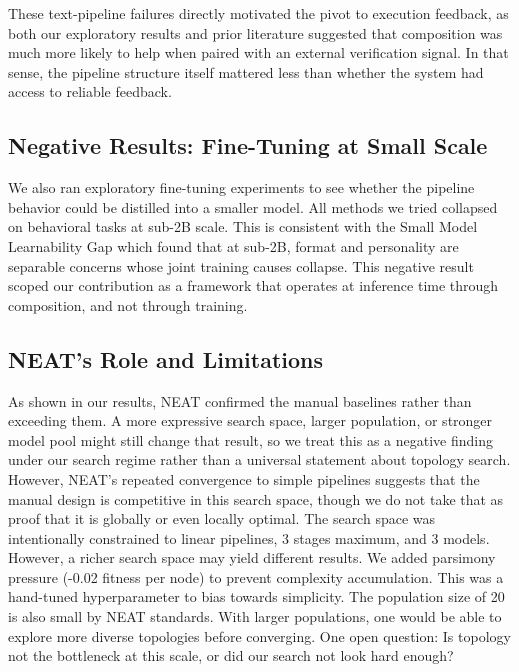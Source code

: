 \documentclass{article}
\begin{document}
These text-pipeline failures directly motivated the pivot to execution feedback, as both our exploratory results and prior literature suggested that composition was much more likely to help when paired with an external verification signal. In that sense, the pipeline structure itself mattered less than whether the system had access to reliable feedback.

\subsection{Negative Results: Fine-Tuning at Small Scale}
We also ran exploratory fine-tuning experiments to see whether the pipeline behavior could be distilled into a smaller model. All methods we tried collapsed on behavioral tasks at sub-2B scale. This is consistent with the Small Model Learnability Gap \cite{learnabilitygap2025} which found that at sub-2B, format and personality are separable concerns whose joint training causes collapse. This negative result scoped our contribution as a framework that operates at inference time through composition, and not through training.

\subsection{NEAT's Role and Limitations}
As shown in our results, NEAT confirmed the manual baselines rather than exceeding them. A more expressive search space, larger population, or stronger model pool might still change that result, so we treat this as a negative finding under our search regime rather than a universal statement about topology search. However, NEAT's repeated convergence to simple pipelines suggests that the manual design is competitive in this search space, though we do not take that as proof that it is globally or even locally optimal. The search space was intentionally constrained to linear pipelines, 3 stages maximum, and 3 models. However, a richer search space may yield different results. We added parsimony pressure (-0.02 fitness per node) to prevent complexity accumulation. This was a hand-tuned hyperparameter to bias towards simplicity. The population size of 20 is also small by NEAT standards. With larger populations, one would be able to explore more diverse topologies before converging. One open question: Is topology not the bottleneck at this scale, or did our search not look hard enough?
\end{document}
